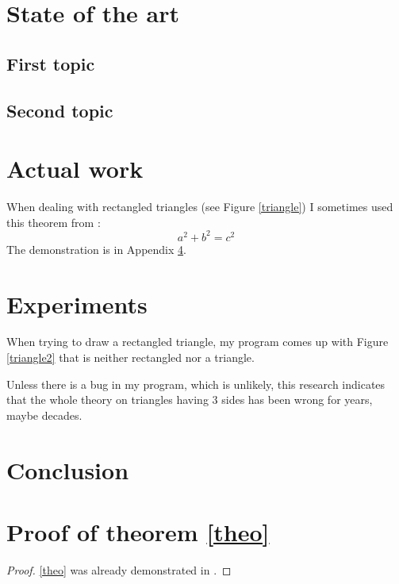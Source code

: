 \documentclass{report}
\begin{document}
 
 \chapter{State of the art}
 
 \section{First topic}
 
 \section{Second topic}
 
 \chapter{Actual work}
  
 
 When dealing with rectangled triangles (see Figure \ref{triangle}) I sometimes used this theorem from \cite{pythm001}:
 \begin{equation}\label{theo}
  a^2 + b^2 = c^2
 \end{equation}The demonstration is in Appendix \ref{sec:prooftheorem}.
 

 
 \chapter{Experiments}
 
 When trying to draw a rectangled triangle, my program comes up with Figure \ref{triangle2} that is neither rectangled nor a triangle.
 

Unless there is a bug in my program, which is unlikely, this research indicates that the whole theory on triangles having 3 sides has been wrong for years, maybe decades.
 
 
 \chapter*{Conclusion}
 
 
 
 
 
 \appendix	
 
 \chapter{Proof of theorem \ref{theo}}
 \label{sec:prooftheorem}
 
 
 \begin{proof}
\eqref{theo} was already demonstrated in \cite{euclides300}.
\end{proof}
 
 
 
 
 
 
 
\end{document}
